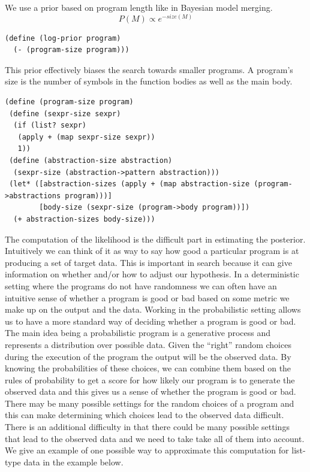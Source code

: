 \documentclass[a4paper,10pt]{article}
\begin{document}
We use a prior based on program length like in Bayesian model merging.  
\begin{equation}P(M)\propto e^{-size(M)}\end{equation}
\begin{lstlisting}[frame=trBL]
(define (log-prior program)
  (- (program-size program)))
\end{lstlisting}
This prior effectively biases the search towards smaller programs.  A program's size is the number of symbols in the function bodies as well as the main body.
\begin{lstlisting}[frame=trBL]
(define (program-size program)
 (define (sexpr-size sexpr)
  (if (list? sexpr)
   (apply + (map sexpr-size sexpr))
   1))
 (define (abstraction-size abstraction)
  (sexpr-size (abstraction->pattern abstraction)))
 (let* ([abstraction-sizes (apply + (map abstraction-size (program->abstractions program)))]
        [body-size (sexpr-size (program->body program))])
  (+ abstraction-sizes body-size)))
\end{lstlisting}
The computation of the likelihood is the difficult part in estimating the posterior.  Intuitively we can think of it as way to say how good a particular program is at producing a set of target data.  This is important in search because it can give information on whether and/or how to adjust our hypothesis.  In a deterministic setting where the programs do not have randomness we can often have an intuitive sense of whether a program is good or bad based on some metric we make up on the output and the data.  Working in the probabilistic setting allows us to have a more standard way of deciding whether a program is good or bad.  The main idea being a probabilistic program is a generative process and represents a distribution over possible data.  Given the ``right'' random choices during the execution of the program the output will be the observed data.  By knowing the probabilities of these choices, we can combine them based on the rules of probability to get a score for how likely our program is to generate the observed data and this gives us a sense of whether the program is good or bad.  There may be many possible settings for the random choices of a program and this can make determining which choices lead to the observed data difficult.  There is an additional difficulty in that there could be many possible settings that lead to the observed data and we need to take take all of them into account.  We give an example of one possible way to approximate this computation for list-type data in the example below.
\end{document}
